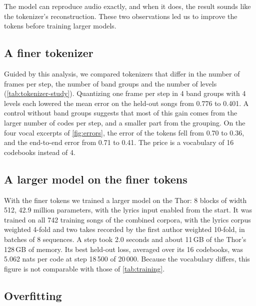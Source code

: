 \begin{observation}
The model can reproduce audio exactly, and when it does, the result sounds
like the tokenizer's reconstruction. These two observations led us to
improve the tokens before training larger models.
\end{observation}

\subsection{A finer tokenizer}

Guided by this analysis, we compared tokenizers that differ in the number of
frames per step, the number of band groups and the number of levels
(\cref{tab:tokenizer-study}). Quantizing one frame per step in 4 band groups
with 4 levels each lowered the mean error on the held-out songs from 0.776 to
0.401. A control without band groups suggests that most of this gain comes from
the larger number of codes per step, and a smaller part from the grouping. On the four vocal excerpts of \cref{fig:errors}, the error of the
tokens fell from 0.70 to 0.36, and the end-to-end error from 0.71 to 0.41. The
price is a vocabulary of 16 codebooks instead of 4.

\subsection{A larger model on the finer tokens}
\label{sec:large}

With the finer tokens we trained a larger model on the Thor: 8 blocks of width
512, 42.9 million parameters, with the lyrics input enabled from the start. It
was trained on all 742 training songs of the combined corpora, with the lyrics
corpus weighted 4-fold and two takes recorded by the first author weighted
10-fold, in batches of 8 sequences. A step took 2.0 seconds and about 11\,GB of
the Thor's 128\,GB of memory. Its best held-out loss, averaged over its 16
codebooks, was 5.062 nats per code at step 18\,500 of 20\,000. Because the
vocabulary differs, this figure is not comparable with those of
\cref{tab:training}.

\subsection{Overfitting}
\label{sec:overfitting}

